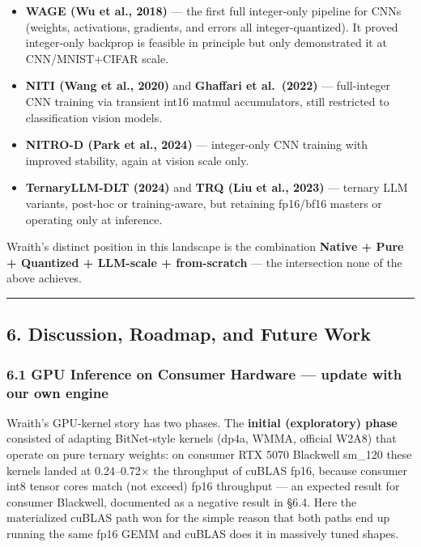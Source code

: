 \begin{itemize}
\tightlist
\item
  \textbf{WAGE (Wu et al., 2018)} --- the first full integer-only
  pipeline for CNNs (weights, activations, gradients, and errors all
  integer-quantized). It proved integer-only backprop is feasible in
  principle but only demonstrated it at CNN/MNIST+CIFAR scale.
\item
  \textbf{NITI (Wang et al., 2020)} and \textbf{Ghaffari et al.~(2022)}
  --- full-integer CNN training via transient int16 matmul accumulators,
  still restricted to classification vision models.
\item
  \textbf{NITRO-D (Park et al., 2024)} --- integer-only CNN training
  with improved stability, again at vision scale only.
\item
  \textbf{TernaryLLM-DLT (2024)} and \textbf{TRQ (Liu et al., 2023)} ---
  ternary LLM variants, post-hoc or training-aware, but retaining
  fp16/bf16 masters or operating only at inference.
\end{itemize}

Wraith's distinct position in this landscape is the combination
\textbf{Native + Pure + Quantized + LLM-scale + from-scratch} --- the
intersection none of the above achieves.

\begin{center}\rule{0.5\linewidth}{0.5pt}\end{center}

\subsection{6. Discussion, Roadmap, and Future
Work}\label{discussion-roadmap-and-future-work}

\subsubsection{6.1 GPU Inference on Consumer Hardware --- update with
our own
engine}\label{gpu-inference-on-consumer-hardware-update-with-our-own-engine}

Wraith's GPU-kernel story has two phases. The \textbf{initial
(exploratory) phase} consisted of adapting BitNet-style kernels (dp4a,
WMMA, official W2A8) that operate on pure ternary weights: on consumer
RTX 5070 Blackwell sm\_120 these kernels landed at 0.24--0.72× the
throughput of cuBLAS fp16, because consumer int8 tensor cores match (not
exceed) fp16 throughput --- an expected result for consumer Blackwell,
documented as a negative result in §6.4. Here the materialized cuBLAS
path won for the simple reason that both paths end up running the same
fp16 GEMM and cuBLAS does it in massively tuned shapes.

